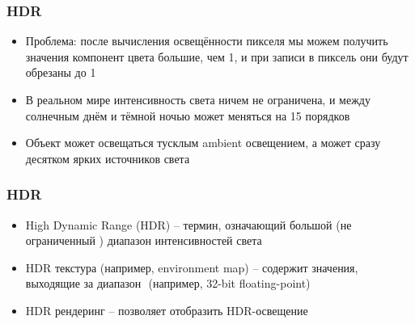 \documentclass[10pt,handout]{beamer}
\begin{document}
\begin{frame}[fragile]
\frametitle{HDR}
\begin{itemize}
\item Проблема: после вычисления освещённости пикселя мы можем получить значения компонент цвета большие, чем 1, и при записи в пиксель они будут обрезаны до 1
\pause
\item В реальном мире интенсивность света ничем не ограничена, и между солнечным днём и тёмной ночью может меняться на 15 порядков
\pause
\item Объект может освещаться тусклым ambient освещением, а может сразу десятком ярких источников света
\end{itemize}
\end{frame}

\begin{frame}[fragile]
\frametitle{HDR}
\begin{itemize}
\item High Dynamic Range (HDR) -- термин, означающий большой (не ограниченный \begin{math}[0, 1]\end{math}) диапазон интенсивностей света
\pause
\item HDR текстура (например, environment map) -- содержит значения, выходящие за диапазон \begin{math}[0, 1]\end{math} (например, 32-bit floating-point)
\pause
\item HDR рендеринг -- позволяет отобразить HDR-освещение
\end{itemize}
\end{frame}
\end{document}
